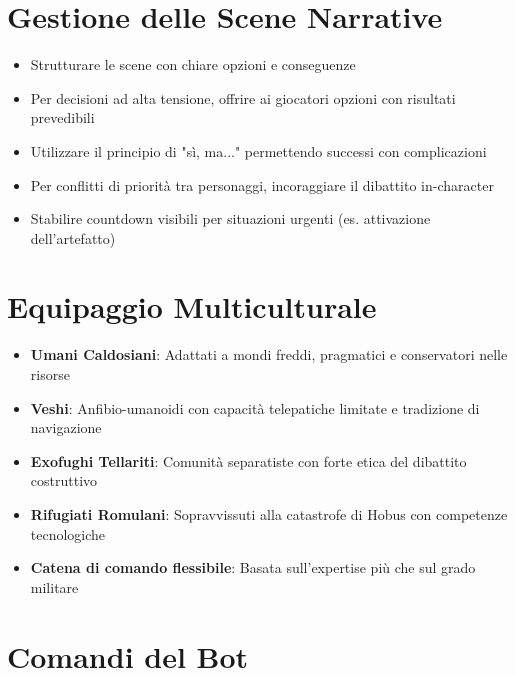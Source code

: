 \documentclass[11pt,a4paper]{article}
\begin{document}
\section{Gestione delle Scene Narrative}

\begin{tcolorbox}[colback=militarylightgray!10, colframe=militaryred]
\begin{itemize}[leftmargin=*]
\item Strutturare le scene con chiare opzioni e conseguenze
\item Per decisioni ad alta tensione, offrire ai giocatori opzioni con risultati prevedibili
\item Utilizzare il principio di "sì, ma..." permettendo successi con complicazioni
\item Per conflitti di priorità tra personaggi, incoraggiare il dibattito in-character
\item Stabilire countdown visibili per situazioni urgenti (es. attivazione dell'artefatto)
\end{itemize}
\end{tcolorbox}

\section{Equipaggio Multiculturale}

\begin{tcolorbox}[colback=militarylightgray!10, colframe=militaryred]
\begin{itemize}[leftmargin=*]
\item \textbf{Umani Caldosiani}: Adattati a mondi freddi, pragmatici e conservatori nelle risorse
\item \textbf{Veshi}: Anfibio-umanoidi con capacità telepatiche limitate e tradizione di navigazione
\item \textbf{Exofughi Tellariti}: Comunità separatiste con forte etica del dibattito costruttivo
\item \textbf{Rifugiati Romulani}: Sopravvissuti alla catastrofe di Hobus con competenze tecnologiche
\item \textbf{Catena di comando flessibile}: Basata sull'expertise più che sul grado militare
\end{itemize}
\end{tcolorbox}

\section{Comandi del Bot}
\end{document}
